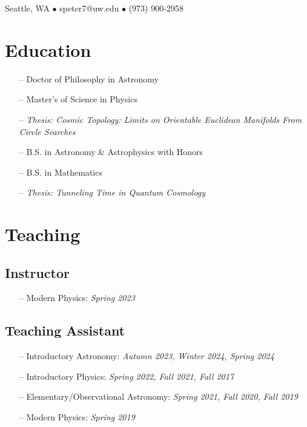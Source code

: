 \documentclass{my_cv}
\begin{document}

\begin{center}
    Seattle, WA  \hspace{0.2pc} $\bullet$ \hspace{0.2pc} speter7@uw.edu \hspace{0.2pc} $\bullet$ \hspace{0.2pc} (973) 900-2958
\end{center}


\section{Education}
\begin{enumerate}
\item[--] {Doctor of Philosophy in Astronomy}
\end{enumerate}

\begin{enumerate}
\item[--] {Master's of Science in Physics}
\item[--] {\textit{Thesis: Cosmic Topology: Limits on Orientable Euclidean Manifolds From Circle Searches}}
\end{enumerate}

\begin{enumerate}
\item[--] {B.S. in Astronomy \& Astrophysics with  Honors}
\item[--] {B.S. in Mathematics}
\item[--] {\textit{Thesis: Tunneling Time in Quantum Cosmology}}
\end{enumerate}



\section{Teaching}
\subsection{Instructor}
\begin{enumerate}
\item[--] {Modern Physics: \textit{Spring 2023}}
\end{enumerate}

\subsection{Teaching Assistant}
\begin{enumerate}
\item[--] {Introductory Astronomy: \textit{Autumn 2023, Winter 2024, Spring 2024}}
\item[--] {Introductory Physics: \textit{Spring 2022, Fall 2021, Fall 2017}}
\item[--] {Elementary/Observational Astronomy: \textit{Spring 2021, Fall 2020, Fall 2019}}
\item[--] {Modern Physics: \textit{Spring 2019}}
\end{enumerate}
\end{document}
